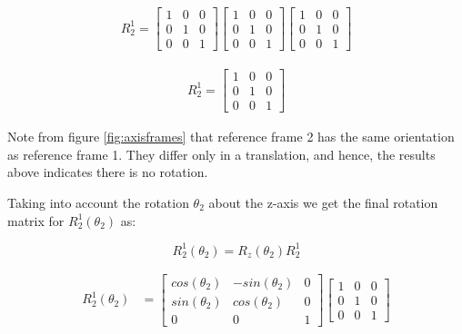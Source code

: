 \documentclass[a4paper, titlepage]{article}
\begin{document}
\begin{equation}
\begin{split}
R^1_{2} = 
\begin{bmatrix}
1 & 0 & 0 \\ 0 & 1 & 0 \\ 0 & 0 & 1 
\end{bmatrix}
\begin{bmatrix}
1 & 0 & 0 \\ 0 & 1 & 0 \\ 0 & 0 & 1 
\end{bmatrix}
\begin{bmatrix}
1 & 0 & 0 \\ 0 & 1 & 0 \\ 0 & 0 & 1 
\end{bmatrix}
\end{split}
\end{equation}

\begin{equation}
\begin{split}
R^1_{2} = 
\begin{bmatrix}
1 & 0 & 0 \\ 0 & 1 & 0 \\ 0 & 0 & 1 
\end{bmatrix}
\end{split}
\end{equation}

Note from figure \ref{fig:axisframes} that reference frame 2 has the same orientation as reference frame 1.  They differ only in a translation, and hence, the results above indicates there is no rotation.

Taking into account the rotation $\theta_{2}$ about the z-axis we get the final rotation matrix for $R^1_{2}(\theta_{2})$ as:

\begin{equation}
R^1_{2}(\theta_{2}) = R_{z}(\theta_{2})R^1_{2}
\end{equation}

\begin{equation}
\begin{split}
R^1_{2}(\theta_{2})
&=
\begin{bmatrix}
cos(\theta_{2}) & -sin(\theta_{2}) & 0 \\ sin(\theta_{2}) & cos(\theta_{2}) & 0 \\ 0 & 0 & 1
\end{bmatrix}
\begin{bmatrix}
1 & 0 & 0 \\ 0 & 1 & 0 \\ 0 & 0 & 1 
\end{bmatrix}
\end{split}
\end{equation}
\end{document}
